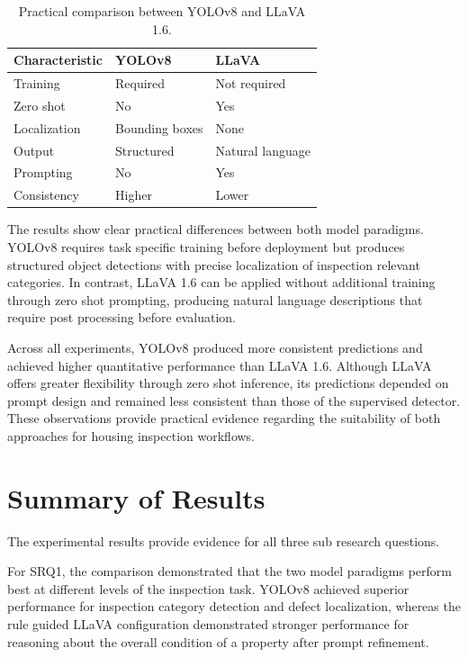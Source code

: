 \begin{table}[H]
\centering
\small
\caption{Practical comparison between YOLOv8 and LLaVA 1.6.}
\label{tab:practical_comparison}
\begin{tabular}{p{1.8cm}p{2cm}p{2cm}}
\toprule
Characteristic & YOLOv8 & LLaVA \\
\midrule
Training & Required & Not required \\
Zero shot & No & Yes \\
Localization & Bounding boxes & None \\
Output & Structured & Natural language \\
Prompting & No & Yes \\
Consistency & Higher & Lower \\
\bottomrule
\end{tabular}
\end{table}

The results show clear practical differences between both model paradigms. YOLOv8 requires task specific training before deployment but produces structured object detections with precise localization of inspection relevant categories\cite{redmon_you_2016,jocher_ultralytics_2023}. In contrast, LLaVA 1.6 can be applied without additional training through zero shot prompting, producing natural language descriptions that require post processing before evaluation\cite{liu_visual_2023}.

Across all experiments, YOLOv8 produced more consistent predictions and achieved higher quantitative performance than LLaVA 1.6. Although LLaVA offers greater flexibility through zero shot inference, its predictions depended on prompt design and remained less consistent than those of the supervised detector. These observations provide practical evidence regarding the suitability of both approaches for housing inspection workflows.

\section{Summary of Results}

The experimental results provide evidence for all three sub research questions.

For SRQ1, the comparison demonstrated that the two model paradigms perform best at different levels of the inspection task. YOLOv8 achieved superior performance for inspection category detection and defect localization, whereas the rule guided LLaVA configuration demonstrated stronger performance for reasoning about the overall condition of a property after prompt refinement.

